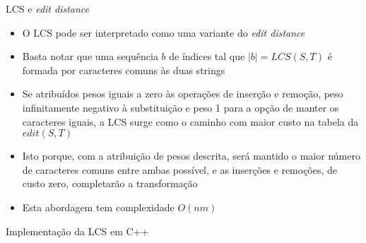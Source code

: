 \begin{frame}[fragile]{LCS e {\it edit distance}}

    \begin{itemize}
        \item O LCS pode ser interpretado como uma variante do \textit{edit distance}
        \pause

        \item Basta notar que uma sequência $b$ de índices tal que $|b| = LCS(S, T)$ é
            formada por caracteres comuns às duas strings
        \pause

        \item Se atribuídos pesos iguais a zero às operações de inserção e remoção, peso 
            infinitamente negativo à substituição e peso 1 para a opção de manter os caracteres iguais, 
            a LCS surge como o caminho com maior custo na tabela da $edit(S, T)$
        \pause

        \item Isto porque, com a atribuição de pesos descrita, será mantido o maior número de
            caracteres comuns entre ambas possível, e as inserções e remoções, de custo zero,
            completarão a transformação
        \pause

        \item Esta abordagem tem complexidade $O(nm)$
    \end{itemize}

\end{frame}



\begin{frame}[fragile]{Implementação da LCS em C++}
\end{frame}
